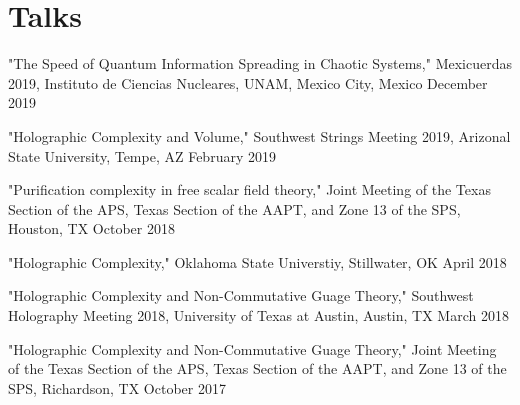 \documentclass[letterpaper]{article}
\renewenvironment{itemize}{
  \begin{list}{}{
    \setlength{\leftmargin}{1.5em}
  }
}{
  \end{list}
}
\begin{document}
\section*{Talks}
\begin{itemize}

\item "The Speed of Quantum Information Spreading in Chaotic Systems," Mexicuerdas 2019, Instituto de Ciencias Nucleares, UNAM, Mexico City, Mexico \hfill December 2019

\item "Holographic Complexity and Volume," Southwest Strings Meeting 2019, Arizonal State University, Tempe, AZ \hfill February 2019

\item "Purification complexity in free scalar field theory," Joint Meeting of the Texas Section of the APS, Texas Section of the AAPT, and Zone 13 of the SPS, Houston, TX \hfill October 2018

\item "Holographic Complexity," Oklahoma State Universtiy, Stillwater, OK \hfill April 2018

\item "Holographic Complexity and Non-Commutative Guage Theory," Southwest Holography Meeting 2018, University of Texas at Austin, Austin, TX \hfill March 2018

\item "Holographic Complexity and Non-Commutative Guage Theory," Joint Meeting of the Texas Section of the APS, Texas Section of the AAPT, and Zone 13 of the SPS, Richardson, TX \hfill October 2017

\end{itemize}
\end{document}
